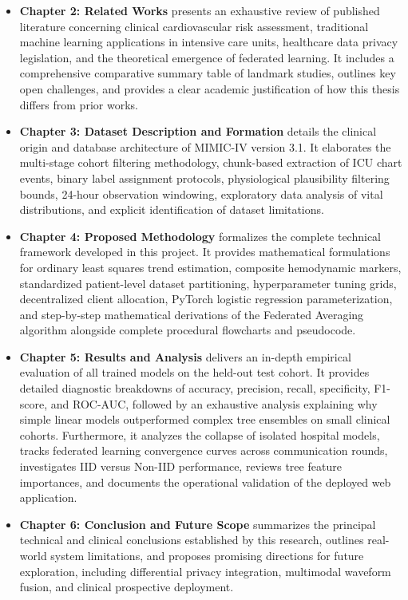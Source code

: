 \documentclass[12pt,a4paper,oneside]{report}
\begin{document}
\begin{itemize}
    \item \textbf{Chapter 2: Related Works} presents an exhaustive review of published literature concerning clinical cardiovascular risk assessment, traditional machine learning applications in intensive care units, healthcare data privacy legislation, and the theoretical emergence of federated learning. It includes a comprehensive comparative summary table of landmark studies, outlines key open challenges, and provides a clear academic justification of how this thesis differs from prior works.
    
    \item \textbf{Chapter 3: Dataset Description and Formation} details the clinical origin and database architecture of MIMIC-IV version 3.1. It elaborates the multi-stage cohort filtering methodology, chunk-based extraction of ICU chart events, binary label assignment protocols, physiological plausibility filtering bounds, 24-hour observation windowing, exploratory data analysis of vital distributions, and explicit identification of dataset limitations.
    
    \item \textbf{Chapter 4: Proposed Methodology} formalizes the complete technical framework developed in this project. It provides mathematical formulations for ordinary least squares trend estimation, composite hemodynamic markers, standardized patient-level dataset partitioning, hyperparameter tuning grids, decentralized client allocation, PyTorch logistic regression parameterization, and step-by-step mathematical derivations of the Federated Averaging algorithm alongside complete procedural flowcharts and pseudocode.
    
    \item \textbf{Chapter 5: Results and Analysis} delivers an in-depth empirical evaluation of all trained models on the held-out test cohort. It provides detailed diagnostic breakdowns of accuracy, precision, recall, specificity, F1-score, and ROC-AUC, followed by an exhaustive analysis explaining why simple linear models outperformed complex tree ensembles on small clinical cohorts. Furthermore, it analyzes the collapse of isolated hospital models, tracks federated learning convergence curves across communication rounds, investigates IID versus Non-IID performance, reviews tree feature importances, and documents the operational validation of the deployed web application.
    
    \item \textbf{Chapter 6: Conclusion and Future Scope} summarizes the principal technical and clinical conclusions established by this research, outlines real-world system limitations, and proposes promising directions for future exploration, including differential privacy integration, multimodal waveform fusion, and clinical prospective deployment.
\end{itemize}
\end{document}
